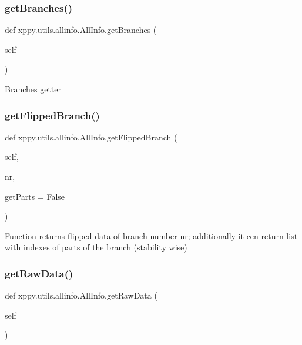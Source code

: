\subsubsection{\texorpdfstring{get\+Branches()}{getBranches()}}
{\footnotesize\ttfamily def xppy.\+utils.\+allinfo.\+All\+Info.\+get\+Branches (\begin{DoxyParamCaption}\item[{}]{self }\end{DoxyParamCaption})}

\begin{DoxyVerb}Branches getter
\end{DoxyVerb}
 \mbox{\label{classxppy_1_1utils_1_1allinfo_1_1_all_info_aef590728eed661ea966a515e778230dc}} 
\subsubsection{\texorpdfstring{get\+Flipped\+Branch()}{getFlippedBranch()}}
{\footnotesize\ttfamily def xppy.\+utils.\+allinfo.\+All\+Info.\+get\+Flipped\+Branch (\begin{DoxyParamCaption}\item[{}]{self,  }\item[{}]{nr,  }\item[{}]{get\+Parts = {\ttfamily False} }\end{DoxyParamCaption})}

\begin{DoxyVerb}Function returns flipped data of branch number nr;
additionally it cen return list with indexes of parts
of the branch (stability wise)
\end{DoxyVerb}
 \mbox{\label{classxppy_1_1utils_1_1allinfo_1_1_all_info_a8693390124c020276177f1de6a88ad65}} 
\subsubsection{\texorpdfstring{get\+Raw\+Data()}{getRawData()}}
{\footnotesize\ttfamily def xppy.\+utils.\+allinfo.\+All\+Info.\+get\+Raw\+Data (\begin{DoxyParamCaption}\item[{}]{self }\end{DoxyParamCaption})}

